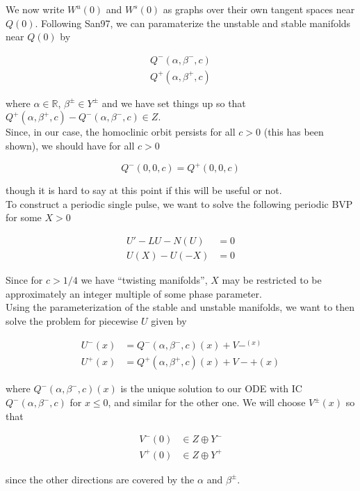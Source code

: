 \documentclass[12pt]{article}
\def\R{{\mathbb R}}
\begin{document}
We now write $W^u(0)$ and $W^s(0)$ as graphs over their own tangent spaces near $Q(0)$. Following San97, we can paramaterize the unstable and stable manifolds near $Q(0)$ by

\begin{align*}
Q^-(\alpha, \beta^-, c) \\
Q^+(\alpha, \beta^+, c)
\end{align*}

where $\alpha \in \R$, $\beta^\pm \in Y^\pm$ and we have set things up so that $Q^+(\alpha, \beta^+, c) - Q^-(\alpha, \beta^-, c) \in Z$. \\

Since, in our case, the homoclinic orbit persists for all $c > 0$ (this has been shown), we should have for all $c > 0$

\[
Q^-(0, 0, c) = Q^+(0, 0, c)
\]

though it is hard to say at this point if this will be useful or not.\\

To construct a periodic single pulse, we want to solve the following periodic BVP for some $X > 0$

\begin{align*}
U' - LU - N(U) &= 0 \\
U(X) - U(-X) &= 0 
\end{align*}

Since for $c > 1/4$ we have ``twisting manifolds'', $X$ may be restricted to be approximately an integer multiple of some phase parameter.\\

Using the parameterization of the stable and unstable manifolds, we want to then solve the problem for piecewise $U$ given by

\begin{align*}
U^-(x) &= Q^-(\alpha, \beta^-, c)(x) + V-^(x) \\
U^+(x) &= Q^+(\alpha, \beta^+, c)(x) + V-+(x)
\end{align*}

where $Q^-(\alpha, \beta^-, c)(x)$ is the unique solution to our ODE with IC $Q^-(\alpha, \beta^-, c)$ for $x \leq 0$, and similar for the other one. We will choose $V^\pm(x)$ so that

\begin{align*}
V^-(0) &\in Z \oplus Y^- \\
V^+(0) &\in Z \oplus Y^+
\end{align*}

since the other directions are covered by the $\alpha$ and $\beta^\pm$.\\
\end{document}
